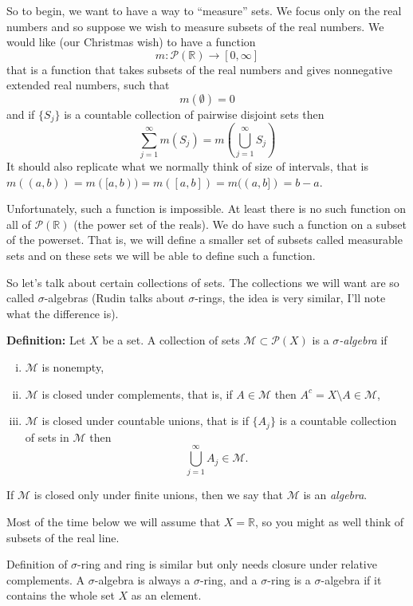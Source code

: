\documentclass[12pt]{book}
\newcommand{\R}{{\mathbb{R}}}
\newcommand{\sM}{{\mathcal{M}}}
\newcommand{\sP}{{\mathcal{P}}}
\theoremstyle{plain}
\theoremstyle{remark}
\theoremstyle{definition}
\theoremstyle{exercise}
\theoremstyle{example}
\begin{document}
\medskip

So to begin, we want to have a way to ``measure'' sets.  We focus
only on the real numbers and so suppose we wish to measure subsets of the real
numbers.  We would like (our Christmas wish) to have a function
$$
m \colon \sP(\R) \to [0,\infty]
$$
that is a function that takes subsets of the real numbers
and gives nonnegative extended real numbers, such that 
$$
m(\emptyset) = 0
$$
and if $\{ S_j \}$ is a countable collection of pairwise disjoint sets then
$$
\sum_{j=1}^\infty m(S_j) = m\left( \bigcup_{j=1}^\infty S_j \right)
$$
It should also replicate what we normally think of size of intervals,
that is $m( (a,b) ) = m([a,b) ) = m([a,b]) = m((a,b]) = b-a$.

Unfortunately, such a function is impossible.  At least there is
no such function on all of $\sP(\R)$ (the power set of the reals).
We do have such a function on a subset of the powerset.  That is,
we will define a smaller set of subsets called measurable sets
and on these sets we will be able to define such a function.

So let's talk about certain collections of sets.  The collections we will
want are so called $\sigma$-algebras (Rudin talks about $\sigma$-rings, the
idea is very similar, I'll note what the difference is).

\medskip

\textbf{Definition:}
Let $X$ be a set.
A collection of sets $\sM \subset \sP(X)$ is a \emph{$\sigma$-algebra} if
\begin{enumerate}[(i)]
\item $\sM$ is nonempty,
\item $\sM$ is closed under complements, that is, if $A \in \sM$ then
$A^c = X \setminus A \in \sM$,
\item $\sM$ is closed under countable unions, that is if $\{ A_j \}$ is
a countable collection of sets in $\sM$ then
$$
\bigcup_{j=1}^\infty A_j \in \sM .
$$
\end{enumerate}
If $\sM$ is closed only under finite unions, then we say that $\sM$ is an
\emph{algebra}.

\medskip

Most of the time below we will assume that $X=\R$, so you might as well
think of subsets of the real line.

\medskip

Definition of $\sigma$-ring and ring is similar but only needs closure under
relative complements.  A $\sigma$-algebra is always a $\sigma$-ring, and a
$\sigma$-ring is a $\sigma$-algebra if it contains the whole
set $X$ as an element.
\end{document}
